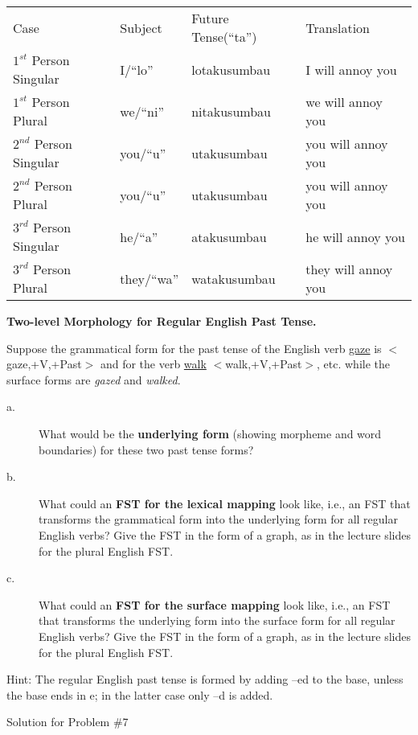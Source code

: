 \documentclass[11pt]{article}
\begin{document}
\begin{solution}
\begin{description}
\begin{tabular}{l l | l l}
 
Case & Subject & Future Tense(``ta'') & Translation \\
$1^{st}$ Person Singular & I/``lo'' & lotakusumbau & I will annoy you \\
$1^{st}$ Person Plural & we/``ni'' & nitakusumbau & we will annoy you \\
$2^{nd}$ Person Singular & you/``u'' & utakusumbau & you will annoy you \\
$2^{nd}$ Person Plural & you/``u'' & utakusumbau & you will annoy you \\
$3^{rd}$ Person Singular & he/``a'' & atakusumbau & he will annoy you  \\
$3^{rd}$ Person Plural & they/``wa'' & watakusumbau & they will annoy you \\ \hline
\end{tabular}

\end{description}

\end{solution}

\vspace*{0.5cm}

\begin{problem}{7}
\textbf{Two-level Morphology for Regular English Past Tense.}

Suppose the grammatical form for the past tense of the English verb \underline{gaze} is $<$gaze,+V,+Past$>$ and for the verb \underline{walk} $<$walk,+V,+Past$>$, etc. while the surface forms are \textit{gazed} and \textit{walked}.

\begin{description}
	\item[a.] What would be the \textbf{underlying form} (showing morpheme and word boundaries) for these two past tense forms?
	
	\item[b.] What could an \textbf{FST for the lexical mapping} look like, i.e., an FST that transforms the grammatical form into the underlying form for all regular English verbs? Give the FST in the form of a graph, as in the lecture slides for the plural English FST.
	
	\item[c.] What could an \textbf{FST for the surface mapping} look like, i.e., an FST that transforms the underlying form into the surface form for all regular English verbs? Give the FST in the form of a graph, as in the lecture slides for the plural English FST.
\end{description}

Hint: The regular English past tense is formed by adding –ed to the base, unless the base ends in e; in the latter case only –d is added.

\end{problem}

\begin{solution}
Solution for Problem \#7
\end{solution}
\end{document}
